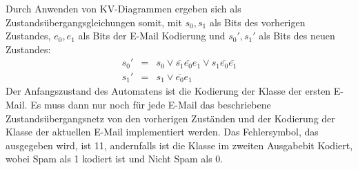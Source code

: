 \documentclass{article}
\begin{document}
Durch Anwenden von KV-Diagrammen ergeben sich als Zustands\"ubergangsgleichungen
somit, mit \(s_0, s_1\) als Bits des vorherigen Zustandes, \(e_0, e_1\) als Bits
der E-Mail Kodierung und \(s_0', s_1'\) als Bits des neuen Zustandes:
\begin{align*}
s_0' &=& s_0 \vee \overline{s_1} \overline{e_0} e_1
           \vee s_1 \overline{e_0} \overline{e_1}\\
s_1' &=& s_1 \vee \overline{e_0} e_1
\end{align*}
Der Anfangszustand des Automatens ist die Kodierung der Klasse der ersten E-Mail.
Es muss dann nur noch f\"ur jede E-Mail das beschriebene Zustands\"ubergangsnetz
von den vorherigen Zust\"anden und der Kodierung der Klasse der aktuellen
E-Mail implementiert werden. Das Fehlersymbol, das ausgegeben wird, ist 11,
andernfalls ist die Klasse im zweiten Ausgabebit Kodiert, wobei Spam als 1 
kodiert ist und Nicht Spam als 0.
\end{document}

